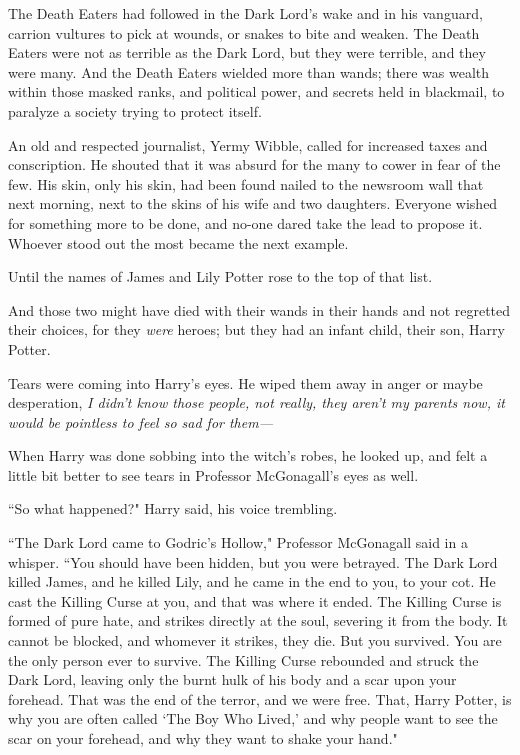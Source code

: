 The Death Eaters had followed in the Dark Lord's wake and in his vanguard, carrion vultures to pick at wounds, or snakes to bite and weaken. The Death Eaters were not as terrible as the Dark Lord, but they were terrible, and they were many. And the Death Eaters wielded more than wands; there was wealth within those masked ranks, and political power, and secrets held in blackmail, to paralyze a society trying to protect itself.

An old and respected journalist, Yermy Wibble, called for increased taxes and conscription. He shouted that it was absurd for the many to cower in fear of the few. His skin, only his skin, had been found nailed to the newsroom wall that next morning, next to the skins of his wife and two daughters. Everyone wished for something more to be done, and no-one dared take the lead to propose it. Whoever stood out the most became the next example.

Until the names of James and Lily Potter rose to the top of that list.

And those two might have died with their wands in their hands and not regretted their choices, for they \emph{were} heroes; but they had an infant child, their son, Harry Potter.

Tears were coming into Harry's eyes. He wiped them away in anger or maybe desperation, \emph{I didn't know those people, not really, they aren't my parents \emph{now}, it would be pointless to feel so sad for them—}

When Harry was done sobbing into the witch's robes, he looked up, and felt a little bit better to see tears in Professor McGonagall's eyes as well.

``So what happened?" Harry said, his voice trembling.

``The Dark Lord came to Godric's Hollow," Professor McGonagall said in a whisper. ``You should have been hidden, but you were betrayed. The Dark Lord killed James, and he killed Lily, and he came in the end to you, to your cot. He cast the Killing Curse at you, and that was where it ended. The Killing Curse is formed of pure hate, and strikes directly at the soul, severing it from the body. It cannot be blocked, and whomever it strikes, they die. But you survived. You are the only person ever to survive. The Killing Curse rebounded and struck the Dark Lord, leaving only the burnt hulk of his body and a scar upon your forehead. That was the end of the terror, and we were free. That, Harry Potter, is why you are often called `The Boy Who Lived,' and why people want to see the scar on your forehead, and why they want to shake your hand."

